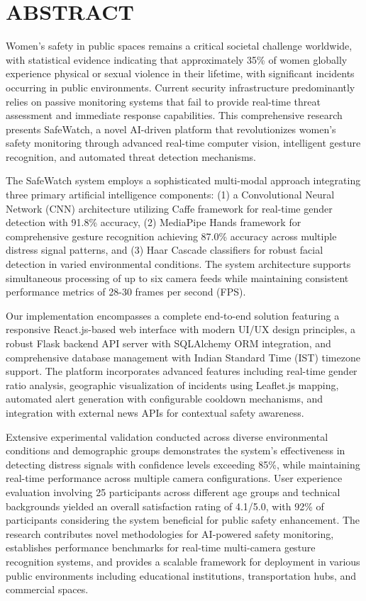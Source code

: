 \documentclass[12pt,a4paper]{article}
\begin{document}
\newpage
{}
\setcounter{page}{1}

\section*{ABSTRACT}
Women's safety in public spaces remains a critical societal challenge worldwide, with statistical evidence indicating that approximately 35\% of women globally experience physical or sexual violence in their lifetime, with significant incidents occurring in public environments. Current security infrastructure predominantly relies on passive monitoring systems that fail to provide real-time threat assessment and immediate response capabilities. This comprehensive research presents SafeWatch, a novel AI-driven platform that revolutionizes women's safety monitoring through advanced real-time computer vision, intelligent gesture recognition, and automated threat detection mechanisms.

The SafeWatch system employs a sophisticated multi-modal approach integrating three primary artificial intelligence components: (1) a Convolutional Neural Network (CNN) architecture utilizing Caffe framework for real-time gender detection with 91.8\% accuracy, (2) MediaPipe Hands framework for comprehensive gesture recognition achieving 87.0\% accuracy across multiple distress signal patterns, and (3) Haar Cascade classifiers for robust facial detection in varied environmental conditions. The system architecture supports simultaneous processing of up to six camera feeds while maintaining consistent performance metrics of 28-30 frames per second (FPS).

Our implementation encompasses a complete end-to-end solution featuring a responsive React.js-based web interface with modern UI/UX design principles, a robust Flask backend API server with SQLAlchemy ORM integration, and comprehensive database management with Indian Standard Time (IST) timezone support. The platform incorporates advanced features including real-time gender ratio analysis, geographic visualization of incidents using Leaflet.js mapping, automated alert generation with configurable cooldown mechanisms, and integration with external news APIs for contextual safety awareness.

Extensive experimental validation conducted across diverse environmental conditions and demographic groups demonstrates the system's effectiveness in detecting distress signals with confidence levels exceeding 85\%, while maintaining real-time performance across multiple camera configurations. User experience evaluation involving 25 participants across different age groups and technical backgrounds yielded an overall satisfaction rating of 4.1/5.0, with 92\% of participants considering the system beneficial for public safety enhancement. The research contributes novel methodologies for AI-powered safety monitoring, establishes performance benchmarks for real-time multi-camera gesture recognition systems, and provides a scalable framework for deployment in various public environments including educational institutions, transportation hubs, and commercial spaces.
\end{document}
